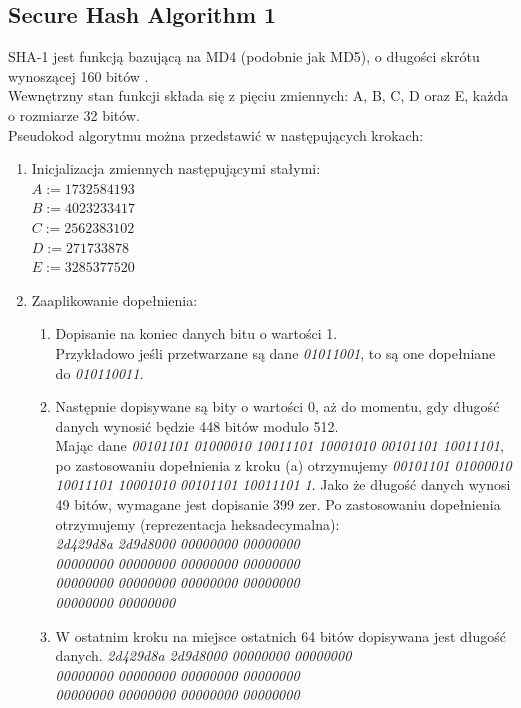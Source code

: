 \subsection{Secure Hash Algorithm 1}
SHA-1 jest funkcją bazującą na MD4 (podobnie jak MD5), o długości skrótu wynoszącej 160 bitów \cite{cryptoirf}. \\
Wewnętrzny stan funkcji składa się z pięciu zmiennych: A, B, C, D oraz E, każda o rozmiarze 32 bitów. \\
Pseudokod algorytmu można przedstawić w następujących krokach:
\begin{enumerate}
	\item Inicjalizacja zmiennych następującymi stałymi: \\
		$A := 1732584193$ \\
		$B := 4023233417$ \\
		$C := 2562383102$ \\
		$D := 271733878$ \\
		$E := 3285377520$ 
	\item Zaaplikowanie dopełnienia:
		\begin{enumerate}
			\item Dopisanie na koniec danych bitu o wartości 1. \\ 
			Przykładowo jeśli przetwarzane są dane \textit{01011001}, to są one dopełniane do \textit{010110011}.
			\item Następnie dopisywane są bity o wartości 0, aż do momentu, gdy długość danych wynosić będzie 448 bitów modulo 512. \\
			Mając dane \textit{00101101 01000010 10011101 10001010 00101101 10011101}, po zastosowaniu dopełnienia z kroku (a) otrzymujemy \textit{00101101 01000010 10011101 10001010 00101101 10011101 1}. Jako że długość danych wynosi 49 bitów, wymagane jest dopisanie 399 zer. Po zastosowaniu dopełnienia otrzymujemy (reprezentacja heksadecymalna): \\
			\textit{2d429d8a 2d9d8000 00000000 00000000 \\ 
					00000000 00000000 00000000 00000000 \\ 
					00000000 00000000 00000000 00000000 \\ 
					00000000 00000000 }
			\item W ostatnim kroku na miejsce ostatnich 64 bitów dopisywana jest długość danych. 
			\textit{2d429d8a 2d9d8000 00000000 00000000 \\ 
					00000000 00000000 00000000 00000000 \\ 
					00000000 00000000 00000000 00000000 \\ 
}
\end{enumerate}
\end{enumerate}
